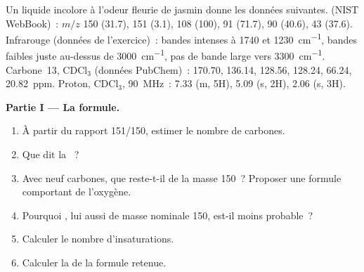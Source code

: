 \begin{problem}
\label{pb:b2:structure-determination:1}
Un liquide incolore à l'odeur fleurie de jasmin donne les données suivantes.  (NIST
WebBook)~: $m/z$ 150 (31.7), 151 (3.1), 108 (100), 91 (71.7), 90 (40.6), 43 (37.6). Infrarouge (données
de l'exercice)~: bandes intenses à 1740 et \qty{1230}{cm^{-1}}, bandes faibles juste au-dessus de
\qty{3000}{cm^{-1}}, pas de
bande large vers \qty{3300}{cm^{-1}}. Carbone~13, CDCl$_3$ (données PubChem)~: 170.70, 136.14, 128.56,
128.24, 66.24, 20.82~ppm. Proton, CDCl$_3$, \qty{90}{MHz}~: 7.33 (m, 5H), 5.09 (s, 2H), 2.06 (s, 3H).

\begin{center}
\end{center}

\medskip
\noindent\textbf{Partie I --- La formule.}
\begin{enumerate}
  \item À partir du rapport 151/150, estimer le nombre de carbones.
  \item Que dit la ~?
  \item Avec neuf carbones, que reste-t-il de la masse 150~? Proposer une formule comportant de l'oxygène.
  \item Pourquoi , lui aussi de masse nominale 150, est-il moins probable~?
  \item Calculer le nombre d'insaturations.
  \item Calculer la  de la formule retenue.
\end{enumerate}


\end{problem}
